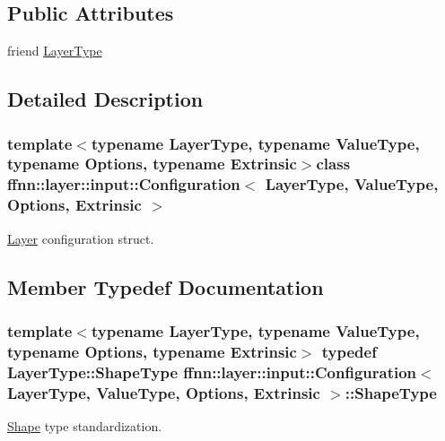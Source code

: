 \subsection*{Public Attributes}
\begin{DoxyCompactItemize}
\item 
friend \hyperlink{classffnn_1_1layer_1_1input_1_1_configuration_aa9f841f1b4632050db96bf5f3718679d}{Layer\-Type}
\end{DoxyCompactItemize}


\subsection{Detailed Description}
\subsubsection*{template$<$typename Layer\-Type, typename Value\-Type, typename Options, typename Extrinsic$>$class ffnn\-::layer\-::input\-::\-Configuration$<$ Layer\-Type, Value\-Type, Options, Extrinsic $>$}

\hyperlink{classffnn_1_1layer_1_1_layer}{Layer} configuration struct. 

\subsection{Member Typedef Documentation}
\hypertarget{classffnn_1_1layer_1_1input_1_1_configuration_afc336872262117979921b387f4a6a257}{
\subsubsection[{Shape\-Type}]{\setlength{\rightskip}{0pt plus 5cm}template$<$typename Layer\-Type, typename Value\-Type, typename Options, typename Extrinsic$>$ typedef Layer\-Type\-::\-Shape\-Type {\bf ffnn\-::layer\-::input\-::\-Configuration}$<$ {\bf Layer\-Type}, Value\-Type, Options, Extrinsic $>$\-::{\bf Shape\-Type}}}\label{classffnn_1_1layer_1_1input_1_1_configuration_afc336872262117979921b387f4a6a257}


\hyperlink{structffnn_1_1layer_1_1_shape}{Shape} type standardization. 



